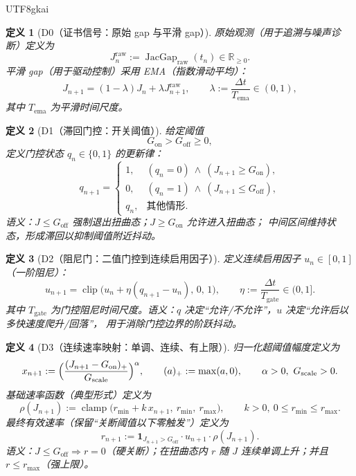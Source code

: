 \documentclass[12pt]{article}
\newtheorem{definition}{定义}[section]
\newcommand{\RR}{\mathbb{R}}
\newcommand{\JacGap}{\operatorname{JacGap}}
\newcommand{\indicator}[1]{\mathbf{1}_{#1}}
\newcommand{\clip}{\operatorname{clip}}
\newcommand{\clamp}{\operatorname{clamp}}
\begin{document}
\begin{CJK*}{UTF8}{gkai}
\begin{definition}[D0（证书信号：原始 gap 与平滑 gap）]
\label{def:tex28-d0}
原始观测（用于追溯与噪声诊断）定义为
\[
  J^{\mathrm{raw}}_n := \JacGap_{\mathrm{raw}}(t_n)\in\RR_{\ge 0}.
\]
平滑 gap（用于驱动控制）采用 EMA（指数滑动平均）：
\[
  J_{n+1} = (1-\lambda)J_n + \lambda J^{\mathrm{raw}}_{n+1},
  \qquad
  \lambda := \frac{\Delta t}{T_{\mathrm{ema}}}\in(0,1),
\]
其中 $T_{\mathrm{ema}}$ 为平滑时间尺度。
\end{definition}

\begin{definition}[D1（滞回门控：开关阈值）]
\label{def:tex28-d1}
给定阈值
\[
  G_{\mathrm{on}} > G_{\mathrm{off}} \ge 0,
\]
定义门控状态 $q_n\in\{0,1\}$ 的更新律：
\[
  q_{n+1}=
  \begin{cases}
    1, & (q_n=0)\ \wedge\ (J_{n+1}\ge G_{\mathrm{on}}),\\
    0, & (q_n=1)\ \wedge\ (J_{n+1}\le G_{\mathrm{off}}),\\
    q_n, & \text{其他情形}.
  \end{cases}
\]
语义：$J\le G_{\mathrm{off}}$ 强制退出扭曲态；$J\ge G_{\mathrm{on}}$ 允许进入扭曲态；
中间区间维持状态，形成滞回以抑制阈值附近抖动。
\end{definition}

\begin{definition}[D2（阻尼门：二值门控到连续启用因子）]
\label{def:tex28-d2}
定义连续启用因子 $u_n\in[0,1]$（一阶阻尼）：
\[
  u_{n+1}=\clip\bigl(u_n+\eta(q_{n+1}-u_n),\,0,\,1\bigr),
  \qquad
  \eta:=\frac{\Delta t}{T_{\mathrm{gate}}}\in(0,1].
\]
其中 $T_{\mathrm{gate}}$ 为门控阻尼时间尺度。语义：$q$ 决定“允许/不允许”，$u$ 决定“允许后以多快速度爬升/回落”，
用于消除门控边界的阶跃抖动。
\end{definition}

\begin{definition}[D3（连续速率映射：单调、连续、有上限）]
\label{def:tex28-d3}
归一化超阈值幅度定义为
\[
  x_{n+1}:=\Bigl(\frac{(J_{n+1}-G_{\mathrm{on}})_{+}}{G_{\mathrm{scale}}}\Bigr)^{\alpha},
  \qquad
  (a)_{+}:=\max(a,0),
  \qquad
  \alpha>0,\ G_{\mathrm{scale}}>0.
\]
基础速率函数（典型形式）定义为
\[
  \rho(J_{n+1}):=\clamp\bigl(r_{\min}+k\,x_{n+1},\ r_{\min},\ r_{\max}\bigr),
  \qquad
  k>0,\ 0\le r_{\min}\le r_{\max}.
\]
最终有效速率（保留“关断阈值以下零触发”）定义为
\[
  r_{n+1}:=\indicator{J_{n+1}>G_{\mathrm{off}}}\cdot u_{n+1}\cdot \rho(J_{n+1}).
\]
语义：$J\le G_{\mathrm{off}}\Rightarrow r=0$（硬关断）；在扭曲态内 $r$ 随 $J$ 连续单调上升；并且 $r\le r_{\max}$（强上限）。
\end{definition}


\end{CJK*}
\end{document}
